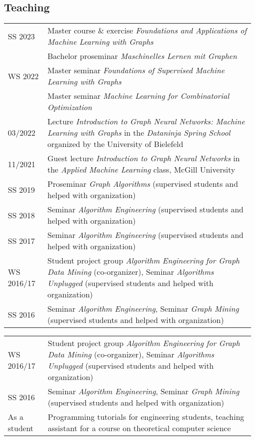 \documentclass[11pt, a4paper, DIV=12]{scrartcl}
\begin{document}
\subsection*{Teaching}

\begin{tabular}{p{2.1cm}p{12.0cm}}
	SS 2023& Master course \& exercise \emph{Foundations and Applications of Machine Learning with Graphs}\\
	& Bachelor proseminar \emph{Maschinelles Lernen mit Graphen}\\
	WS 2022& Master seminar \emph{Foundations of Supervised Machine Learning with Graphs}\\
	& Master seminar \emph{Machine Learning for Combinatorial Optimization} \\
	03/2022	& Lecture \emph{Introduction to Graph Neural Networks: Machine Learning with Graphs} in the \emph{Dataninja Spring School} organized by the University of Bielefeld\\
	11/2021 & Guest lecture \emph{Introduction to Graph Neural Networks} in the \emph{Applied Machine Learning} class, McGill University\\	
	SS 2019&Proseminar \emph{Graph Algorithms} (supervised students and helped with organization)\\
	SS 2018&Seminar \emph{Algorithm Engineering} (supervised students and helped with organization)\\
	SS 2017&Seminar \emph{Algorithm Engineering} (supervised students and helped with organization)\\
	WS 2016/17&Student project group \emph{Algorithm Engineering for Graph Data Mining} (co-organizer), Seminar \emph{Algorithms Unplugged} (supervised students and helped with organization)\\
	SS 2016& Seminar \emph{Algorithm Engineering}, Seminar \emph{Graph Mining} (supervised students and helped with organization)\\
\end{tabular}

\begin{tabular}{p{2.1cm}p{12.0cm}}
	WS 2016/17&Student project group \emph{Algorithm Engineering for Graph Data Mining} (co-organizer), Seminar \emph{Algorithms Unplugged} (supervised students and helped with organization)\\
	SS 2016& Seminar \emph{Algorithm Engineering}, Seminar \emph{Graph Mining} (supervised students and helped with organization)\\
	As a student&Programming tutorials for engineering students, teaching assistant for a course on theoretical computer science\\
\end{tabular}
\end{document}
